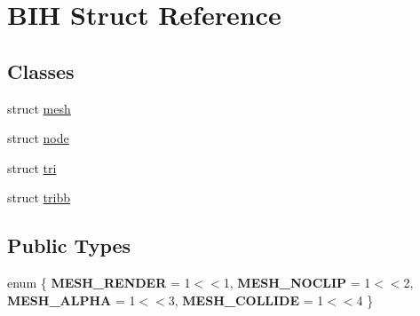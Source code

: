 \hypertarget{struct_b_i_h}{}\section{B\+IH Struct Reference}
\label{struct_b_i_h}
\subsection*{Classes}
\begin{DoxyCompactItemize}
\item 
struct \hyperlink{struct_b_i_h_1_1mesh}{mesh}
\item 
struct \hyperlink{struct_b_i_h_1_1node}{node}
\item 
struct \hyperlink{struct_b_i_h_1_1tri}{tri}
\item 
struct \hyperlink{struct_b_i_h_1_1tribb}{tribb}
\end{DoxyCompactItemize}
\subsection*{Public Types}
\begin{DoxyCompactItemize}
\item 
\mbox{\label{struct_b_i_h_ace901662594827aaf93ac979468a34e3}} 
enum \{ {\bfseries M\+E\+S\+H\+\_\+\+R\+E\+N\+D\+ER} = 1$<$$<$1, 
{\bfseries M\+E\+S\+H\+\_\+\+N\+O\+C\+L\+IP} = 1$<$$<$2, 
{\bfseries M\+E\+S\+H\+\_\+\+A\+L\+P\+HA} = 1$<$$<$3, 
{\bfseries M\+E\+S\+H\+\_\+\+C\+O\+L\+L\+I\+DE} = 1$<$$<$4
 \}
\end{DoxyCompactItemize}

